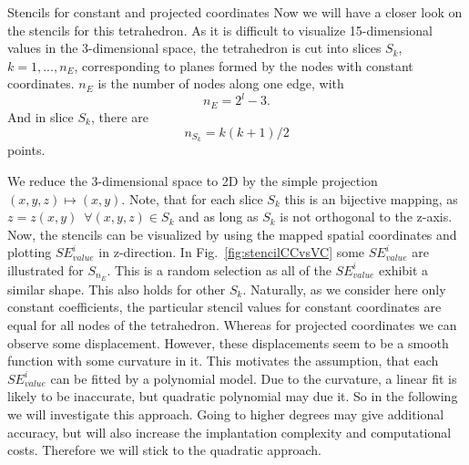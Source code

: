 \documentclass[a4paper,11pt,reqno]{amsart}
\numberwithin{figure}{section}
\numberwithin{table}{section}
\numberwithin{figure}{section}
\def\si{SE_{value}^i}
\begin{document}
\begin{section}{Stencils for constant and projected coordinates}
Now we will have a closer look on the stencils for this tetrahedron. As it is difficult 
to visualize 15-dimensional values in the 3-dimensional space, the tetrahedron is
cut into slices $S_k$, $k = 1,...,n_E$, corresponding to planes formed by the nodes
with constant coordinates.
$n_E$ is the number of nodes along one edge, with
\begin{equation}
n_E = 2^l-3.
\end{equation}
And in slice $S_k$, there are
\begin{equation}
n_{S_k} = k(k+1)/2
\end{equation}
points.

We reduce the 3-dimensional space to 2D by the simple projection $(x,y,z) \mapsto (x,y)$.
Note, that for each slice $S_k$ this is an bijective mapping, as 
$z = z(x,y)\enspace\forall(x,y,z)\in S_k$ and as long as $S_k$ is not orthogonal to the
z-axis. Now, the stencils can be visualized by using
the mapped spatial coordinates and plotting $\si$ in z-direction. 
In Fig.~\ref{fig:stencilCCvsVC} some $\si$ are illustrated for $S_{n_E}$. This is a
random selection as all of the $\si$ exhibit a similar shape. This also holds for other
$S_k$.
Naturally, as we consider here only constant coefficients, the particular stencil values 
for constant coordinates are equal for all nodes of the tetrahedron. Whereas for projected
coordinates we can observe some displacement. However, these displacements seem to
be a smooth function with some curvature in it. This motivates the assumption, that each
$\si$ can be fitted by a polynomial model. Due to the curvature, a linear fit is likely 
to be inaccurate, but quadratic polynomial may due it. So in the following we will 
investigate this approach.
Going to higher degrees may give additional accuracy, but will also increase the 
implantation complexity and computational costs. Therefore we will stick to the 
quadratic approach.



\end{section}
\end{document}
